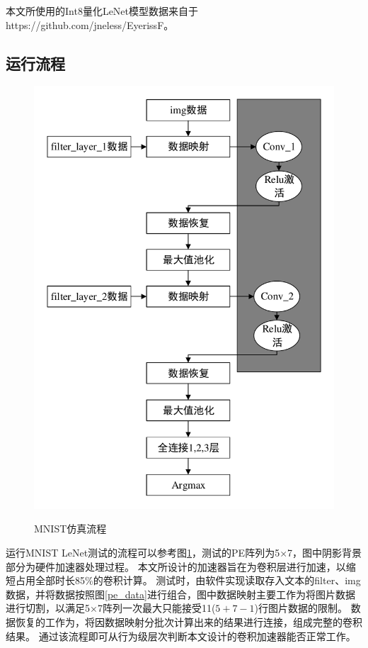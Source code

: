     本文所使用的Int8量化LeNet模型数据来自于https://github.com/jneless/EyerissF。

    \subsection{运行流程}
\begin{figure}[h]
    \centering
    \includegraphics[scale=0.7]{../pdf/MNIST.pdf}\\
    \caption{MNIST仿真流程}
    \label{mnist_k}
\end{figure}
    运行MNIST LeNet测试的流程可以参考图\ref{mnist_k}，测试的PE阵列为5×7，图中阴影背景部分为硬件加速器处理过程。
    本文所设计的加速器旨在为卷积层进行加速，以缩短占用全部时长85\%的卷积计算。
    测试时，由软件实现读取存入文本的filter、img数据，并将数据按照图\ref{pe_data}进行组合，图中数据映射主要工作为将图片数据进行切割，以满足5×7阵列一次最大只能接受11($5 + 7 - 1$)行图片数据的限制。
    数据恢复的工作为，将因数据映射分批次计算出来的结果进行连接，组成完整的卷积结果。
    通过该流程即可从行为级层次判断本文设计的卷积加速器能否正常工作。
